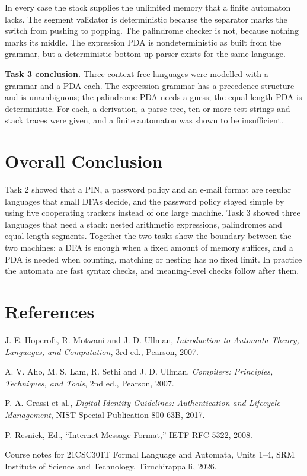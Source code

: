 \documentclass[12pt,a4paper]{article}
\begin{document}
In every case the stack supplies the unlimited memory that a finite automaton lacks. The segment validator is deterministic because the separator marks the switch from pushing to popping. The palindrome checker is not, because nothing marks its middle. The expression PDA is nondeterministic as built from the grammar, but a deterministic bottom-up parser exists for the same language.

\textbf{Task 3 conclusion.} Three context-free languages were modelled with a grammar and a PDA each. The expression grammar has a precedence structure and is unambiguous; the palindrome PDA needs a guess; the equal-length PDA is deterministic. For each, a derivation, a parse tree, ten or more test strings and stack traces were given, and a finite automaton was shown to be insufficient.

\section{Overall Conclusion}

Task 2 showed that a PIN, a password policy and an e-mail format are regular languages that small DFAs decide, and the password policy stayed simple by using five cooperating trackers instead of one large machine. Task 3 showed three languages that need a stack: nested arithmetic expressions, palindromes and equal-length segments. Together the two tasks show the boundary between the two machines: a DFA is enough when a fixed amount of memory suffices, and a PDA is needed when counting, matching or nesting has no fixed limit. In practice the automata are fast syntax checks, and meaning-level checks follow after them.

\section*{References}

\begin{enumerate}[label={[\arabic*]},leftmargin=2.2em,itemsep=3pt]
\item J. E. Hopcroft, R. Motwani and J. D. Ullman, \textit{Introduction to Automata Theory, Languages, and Computation}, 3rd ed., Pearson, 2007.
\item A. V. Aho, M. S. Lam, R. Sethi and J. D. Ullman, \textit{Compilers: Principles, Techniques, and Tools}, 2nd ed., Pearson, 2007.
\item P. A. Grassi et al., \textit{Digital Identity Guidelines: Authentication and Lifecycle Management}, NIST Special Publication 800-63B, 2017.
\item P. Resnick, Ed., ``Internet Message Format,'' IETF RFC 5322, 2008.
\item Course notes for 21CSC301T Formal Language and Automata, Units 1--4, SRM Institute of Science and Technology, Tiruchirappalli, 2026.
\end{enumerate}
\end{document}
